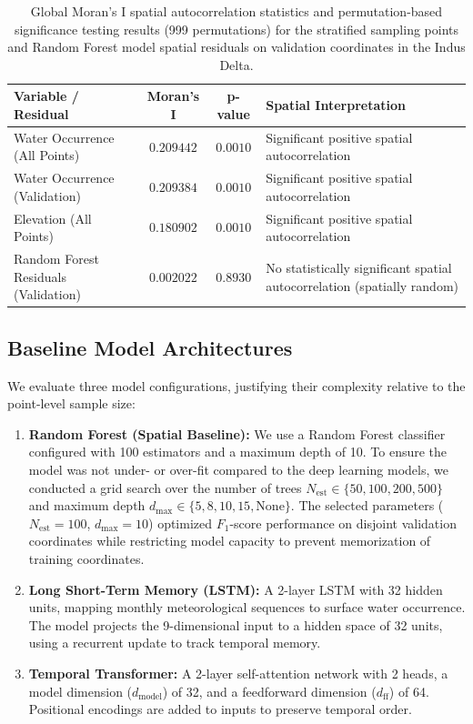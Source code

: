 \documentclass[12pt, a4paper]{article}
\begin{document}
\begin{table}[t]
\caption{Global Moran's I spatial autocorrelation statistics and permutation-based significance testing results (999 permutations) for the stratified sampling points and Random Forest model spatial residuals on validation coordinates in the Indus Delta.}
\label{tab:spatial_autocorrelation}
\centering
\small
\begin{tabular}{p{4.2cm} c c p{6.5cm}}
\hline
\textbf{Variable / Residual} & \textbf{Moran's I} & \textbf{p-value} & \textbf{Spatial Interpretation} \\
\hline
Water Occurrence (All Points) & $0.209442$ & $0.0010$ & Significant positive spatial autocorrelation \\
Water Occurrence (Validation) & $0.209384$ & $0.0010$ & Significant positive spatial autocorrelation \\
Elevation (All Points) & $0.180902$ & $0.0010$ & Significant positive spatial autocorrelation \\
Random Forest Residuals (Validation) & $0.002022$ & $0.8930$ & No statistically significant spatial autocorrelation (spatially random) \\
\hline
\end{tabular}
\end{table}

 
\subsection{Baseline Model Architectures}
We evaluate three model configurations, justifying their complexity relative to the point-level sample size:
\begin{enumerate}
    \item \textbf{Random Forest (Spatial Baseline):} We use a Random Forest classifier configured with 100 estimators and a maximum depth of 10. To ensure the model was not under- or over-fit compared to the deep learning models, we conducted a grid search over the number of trees $N_{\text{est}} \in \{50, 100, 200, 500\}$ and maximum depth $d_{\text{max}} \in \{5, 8, 10, 15, \text{None}\}$. The selected parameters ($N_{\text{est}} = 100$, $d_{\text{max}} = 10$) optimized $F_1$-score performance on disjoint validation coordinates while restricting model capacity to prevent memorization of training coordinates.
    \item \textbf{Long Short-Term Memory (LSTM):} A 2-layer LSTM with 32 hidden units, mapping monthly meteorological sequences to surface water occurrence. The model projects the 9-dimensional input to a hidden space of 32 units, using a recurrent update to track temporal memory.
    \item \textbf{Temporal Transformer:} A 2-layer self-attention network with 2 heads, a model dimension ($d_{\text{model}}$) of 32, and a feedforward dimension ($d_{\text{ff}}$) of 64. Positional encodings are added to inputs to preserve temporal order.
\end{enumerate}
\end{document}
